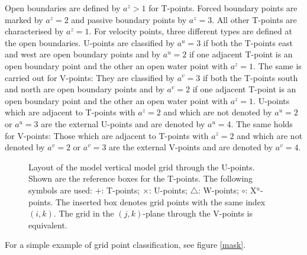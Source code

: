 Open boundaries are defined by $a^z>1$ for T-points.
Forced boundary points are marked by $a^z=2$ and passive
boundary points by $a^z=3$. 
All other T-points are characterised by $a^z=1$. 
For velocity points, three different types are defined at the
open boundaries. U-points are classified by $a^u=3$ if both 
the T-points east and west are open boundary points and by $a^u=2$
if one adjacent T-point is an open boundary point and the other 
an open water point with $a^z=1$. The same
is carried out for V-points: They are classified by $a^v=3$ if both
the T-points south and north are open boundary points and by $a^v=2$
if one adjacent T-point is an open boundary point
and the other an open water point with $a^z=1$.
U-points which are adjacent to T-points with $a^z=2$ and
which are not denoted by $a^u=2$ or $a^u=3$ are the external U-points
and are denoted by $a^u=4$. The same holds for V-points:
Those which are adjacent to T-points with $a^z=2$ and
which are not denoted by $a^v=2$ or $a^v=3$ are the external V-points
and are denoted by $a^v=4$.

\begin{figure}
\begin{center}
\caption{Layout of the model vertical model grid through the U-points. 
Shown are the
reference boxes for the T-points. The following symbols are used:
$+$: T-points; $\times$: U-points; $\triangle$: W-points; $\circ$: X$^u$-points.
The inserted box denotes grid points with the same index $(i,k)$.
The grid in the $(j,k)$-plane through the V-points is equivalent.}
\label{figvertgrid}
\end{center}
\end{figure}

For a simple example of grid point classification, see figure 
\ref{mask}.

